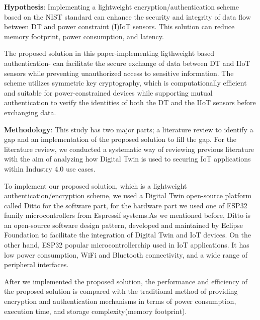 \textbf{Hypothesis}:
Implementing a lightweight encryption/authentication scheme based on the NIST standard can enhance the security and integrity of data flow between DT and power constraint (I)IoT sensors. This solution can reduce memory footprint, power consumption, and latency. 

The proposed solution in this paper-implementing ligthweight based authentication- can facilitate the secure exchange of data between DT and IIoT sensors while preventing unauthorized access to sensitive information. The scheme utilizes symmetric key cryptography, which is computationally efficient and suitable for power-constrained devices while supporting mutual authentication to verify the identities of both the DT and the IIoT sensors before exchanging data.







\textbf{Methodology}:
This study has two major parts; a literature review to identify a gap and an implementation of the proposed solution to fill the gap. For the literature review, we conducted a systematic way of reviewing previous literature with the aim of analyzing how Digital Twin is used to securing IoT applications within Industry 4.0 use cases. 

To implement our proposed solution, which is a lightweight authentication/encryption scheme, we used a Digital Twin open-source platform called Ditto for the software part, for the hardware part we used one of ESP32 family microcontrollers from Espressif systems.As we mentioned before, Ditto is an open-source software design pattern, developed and maintained by Eclipse Foundation to facilitate the integration of Digital Twin and IoT devices\cite{noauthor_eclipse_nodate}. On the other hand, ESP32 popular microcontrollerchip used in IoT applications. It has low power consumption, WiFi and Bluetooth connectivity, and a wide range of peripheral interfaces.  

After we implemented the proposed solution, the performance and efficiency of the proposed solution is compared with the traditional  method of providing encryption and authentication mechanisms in terms of power consumption, execution time, and storage complexity(memory footprint). 


